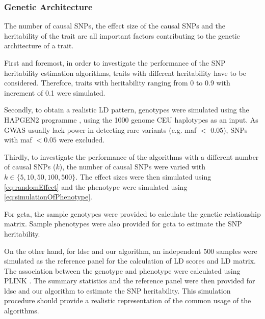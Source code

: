 		\subsubsection{Genetic Architecture}
			The number of causal \glspl{SNP}, the effect size of the causal \glspl{SNP} and the heritability of the trait are all important factors contributing to the genetic architecture of a trait. 
		
			First and foremost, in order to investigate the performance of the \gls{SNP} heritability estimation algorithms, traits with different heritability have to be considered.
			Therefore, traits with heritability ranging from 0 to 0.9 with increment of 0.1 were simulated. 
		

			Secondly, to obtain a realistic \gls{LD} pattern, genotypes were simulated using the HAPGEN2 programme \citep{Su2011}, using the 1000 genome \gls{CEU} haplotypes as an input.
			As \gls{GWAS} usually lack power in detecting rare variants (e.g. \gls{maf} $<$ 0.05), \glspl{SNP} with \gls{maf} $<0.05$ were excluded.
			
			Thirdly, to investigate the performance of the algorithms with a different number of causal \glspl{SNP} ($k$), the number of causal \glspl{SNP} were varied with $k\in\{5, 10, 50, 100, 500\}$.
			The effect sizes were then simulated using \cref{eq:randomEffect} and the phenotype were simulated using \cref{eq:simulationOfPhenotype}.
			
			For \gls{gcta}, the sample genotypes were provided to calculate the genetic relationship matrix. 
			Sample phenotypes were also provided for \gls{gcta} to estimate the \gls{SNP} heritability.
			
			On the other hand, for \gls{ldsc} and our algorithm, an independent 500 samples were simulated as the reference panel for the calculation of \gls{LD} scores and \gls{LD} matrix. 
			The association between the genotype and phenotype were calculated using PLINK \citep{Purcell2007}.
			The summary statistics and the reference panel were then provided for \gls{ldsc} and our algorithm to estimate the \gls{SNP} heritability.
			This simulation procedure should provide a realistic representation of the common usage of the algorithms.
			
